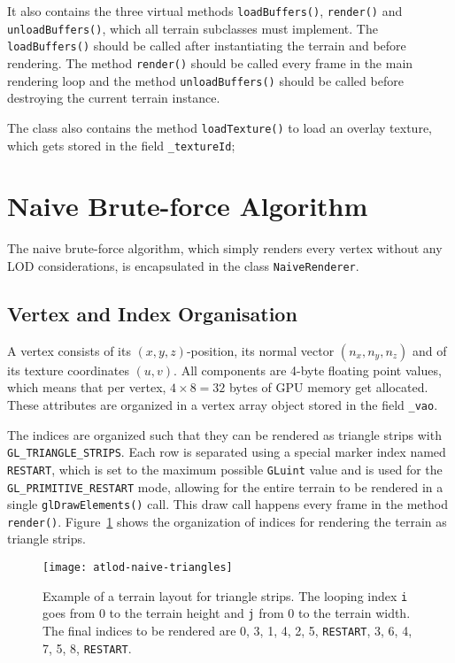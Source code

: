 It also contains the three virtual methods \texttt{loadBuffers()}, \texttt{render()}
and \texttt{unloadBuffers()}, which all terrain subclasses must implement.
The \texttt{loadBuffers()} should be called after instantiating the terrain 
and before rendering. The method \texttt{render()} should be called every 
frame in the main rendering loop and the method \texttt{unloadBuffers()}
should be called before destroying the current terrain instance.

The class also contains the method \texttt{loadTexture()} to load an overlay texture,
which gets stored in the field \texttt{\_textureId};

\section{Naive Brute-force Algorithm}
The naive brute-force algorithm, which simply renders every vertex without any LOD considerations, is encapsulated in the class \texttt{NaiveRenderer}.

\subsection{Vertex and Index Organisation}
A vertex consists of its $(x,y,z)$-position,
its normal vector $(n_x,n_y,n_z)$ and of its
texture coordinates $(u,v)$. All components
are 4-byte floating point values, which means that 
per vertex, $4 \times 8 = 32$ bytes of GPU memory
get allocated. These attributes are organized 
in a vertex array object stored in the field \texttt{\_vao}.

The indices are organized such that they can be rendered as triangle strips with \texttt{GL\_TRIANGLE\_STRIPS}.
Each row is separated using a special marker index named \texttt{RESTART}, which is set to the maximum possible \texttt{GLuint} value and is used for the \texttt{GL\_PRIMITIVE\_RESTART} mode,
allowing for the entire terrain to be rendered in a single \texttt{glDrawElements()} call. This draw call happens every frame in the 
method \texttt{render()}. Figure~\ref{fig:naive-triangles} shows the organization of indices for rendering the terrain as triangle strips.

\begin{figure}[H]
  \centering
  \texttt{[image: atlod-naive-triangles]}
  \caption{Example of a terrain layout for triangle strips. The looping index \texttt{i} goes from 0 to the terrain height and \texttt{j} from 0 to the terrain width. The final indices to be rendered are 0, 3, 1, 4, 2, 5, \texttt{RESTART}, 3, 6, 4, 7, 5, 8, \texttt{RESTART}.}\label{fig:naive-triangles}
\end{figure}

